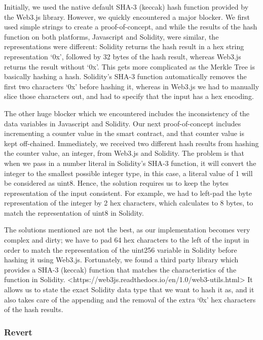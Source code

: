 Initially, we used the native default SHA-3 (keccak) hash function provided by the Web3.js library. However, we quickly encountered a major blocker. We first used simple strings to create a proof-of-concept, and while the results of the hash function on both platforms, Javascript and Solidity, were similar, the representations were different: Solidity returns the hash result in a hex string representation ‘0x’, followed by 32 bytes of the hash result, whereas Web3.js returns the result without ‘0x’. This gets more complicated as the Merkle Tree is basically hashing a hash. Solidity’s SHA-3 function automatically removes the first two characters ‘0x’ before hashing it, whereas in Web3.js we had to manually slice those characters out, and had to specify that the input has a hex encoding. 

The other huge blocker which we encountered includes the inconsistency of the data variables in Javascript and Solidity. Our next proof-of-concept includes incrementing a counter value in the smart contract, and that counter value is kept off-chained. Immediately, we received two different hash results from hashing the counter value, an integer, from Web3.js and Solidity. The problem is that when we pass in a number literal in Solidity’s SHA-3 function, it will convert the integer to the smallest possible integer type, in this case, a literal value of 1 will be considered as uint8. Hence, the solution requires us to keep the bytes representation of the input consistent. For example, we had to left-pad the byte representation of the integer by 2 hex characters, which calculates to 8 bytes, to match the representation of uint8 in Solidity. 

The solutions mentioned are not the best, as our implementation becomes very complex and dirty; we have to pad 64 hex characters to the left of the input in order to match the representation of the uint256 variable in Solidity before hashing it using Web3.js. Fortunately, we found a third party library which provides a SHA-3 (keccak) function that matches the characteristics of the function in Solidity. <https://web3js.readthedocs.io/en/1.0/web3-utils.html> It allows us to state the exact Solidity data type that we want to hash it as, and it also takes care of the appending and the removal of the extra ‘0x’ hex characters of the hash results.

\subsubsection*{Revert}

